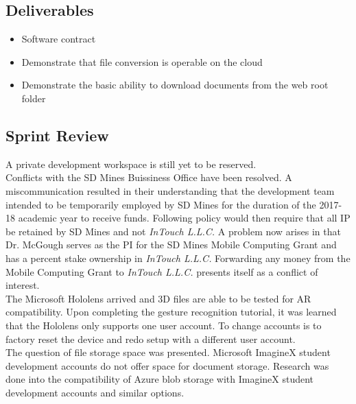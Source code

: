     \subsection{Deliverables}
    \label{sec:Sprint3_deliverables}
        \begin{itemize}
            \item Software contract
            \item Demonstrate that file conversion is operable on the cloud
            \item Demonstrate the basic ability to download documents from the web root folder
        \end{itemize}

    \subsection{Sprint Review}
    \label{sec:Sprint3_review}
        \hspace{7mm}
        A private development workspace is still yet to be reserved.\\

        Conflicts with the SD Mines Buissiness Office have been resolved.  A miscommunication resulted in their
        understanding that the development team intended to be temporarily employed by SD Mines for the duration
        of the 2017-18 academic year to receive funds.  Following policy would then require that all IP be retained
        by SD Mines and not \textit{InTouch L.L.C.}  A problem now arises in that Dr. McGough serves as the PI for
        the SD Mines Mobile Computing Grant and has a percent stake ownership in \textit{InTouch L.L.C.}  Forwarding
        any money from the Mobile Computing Grant to \textit{InTouch L.L.C.} presents itself as a conflict of interest.\\
        
        The Microsoft Hololens arrived and 3D files are able to be tested for AR compatibility.  Upon completing
        the gesture recognition tutorial, it was learned that the Hololens only supports one user account.  To
        change accounts is to factory reset the device and redo setup with a different user account.\\

        The question of file storage space was presented.  Microsoft ImagineX student development accounts do not
        offer space for document storage.  Research was done into the compatibility of Azure blob storage with 
        ImagineX student development accounts and similar options.\\
        
